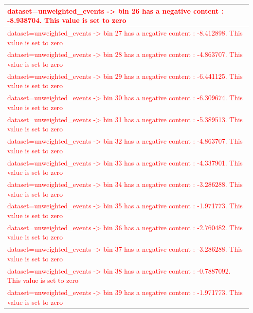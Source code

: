 \documentclass[a4paper, 10pt]{article}
\begin{document}
\begin{table}[H]
\begin{center}
\begin{tabular}{|m{140.0mm}|}
      \hline
      {\cellcolor{white}\textcolor{red}{dataset=unweighted\_events -> bin 26 has a negative content : -8.938704. This value is set to zero}}\\
      \hline
      {\cellcolor{white}\textcolor{red}{dataset=unweighted\_events -> bin 27 has a negative content : -8.412898. This value is set to zero}}\\
      \hline
      {\cellcolor{white}\textcolor{red}{dataset=unweighted\_events -> bin 28 has a negative content : -4.863707. This value is set to zero}}\\
      \hline
      {\cellcolor{white}\textcolor{red}{dataset=unweighted\_events -> bin 29 has a negative content : -6.441125. This value is set to zero}}\\
      \hline
      {\cellcolor{white}\textcolor{red}{dataset=unweighted\_events -> bin 30 has a negative content : -6.309674. This value is set to zero}}\\
      \hline
      {\cellcolor{white}\textcolor{red}{dataset=unweighted\_events -> bin 31 has a negative content : -5.389513. This value is set to zero}}\\
      \hline
      {\cellcolor{white}\textcolor{red}{dataset=unweighted\_events -> bin 32 has a negative content : -4.863707. This value is set to zero}}\\
      \hline
      {\cellcolor{white}\textcolor{red}{dataset=unweighted\_events -> bin 33 has a negative content : -4.337901. This value is set to zero}}\\
      \hline
      {\cellcolor{white}\textcolor{red}{dataset=unweighted\_events -> bin 34 has a negative content : -3.286288. This value is set to zero}}\\
      \hline
      {\cellcolor{white}\textcolor{red}{dataset=unweighted\_events -> bin 35 has a negative content : -1.971773. This value is set to zero}}\\
      \hline
      {\cellcolor{white}\textcolor{red}{dataset=unweighted\_events -> bin 36 has a negative content : -2.760482. This value is set to zero}}\\
      \hline
      {\cellcolor{white}\textcolor{red}{dataset=unweighted\_events -> bin 37 has a negative content : -3.286288. This value is set to zero}}\\
      \hline
      {\cellcolor{white}\textcolor{red}{dataset=unweighted\_events -> bin 38 has a negative content : -0.7887092. This value is set to zero}}\\
      \hline
      {\cellcolor{white}\textcolor{red}{dataset=unweighted\_events -> bin 39 has a negative content : -1.971773. This value is set to zero}}\\
      \hline
\hline
    \end{tabular}
  \end{center}
\end{table}
\end{document}
